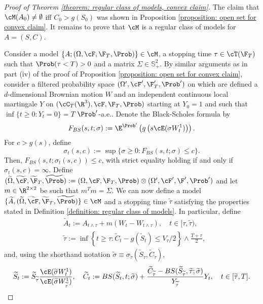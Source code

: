 \documentclass[11pt]{article}
\begin{document}
\begin{proof}[Proof of Theorem \ref{theorem: regular class of models, convex claim}]

The claim that $\cM(A_0) \neq \emptyset$ iff $C_0 > g(S_0)$ was shown in Proposition \ref{proposition: open set for convex claim}. It remains to prove that $\cM$ is a regular class of models for $A = (S,C)$.

Consider a model $\{A ; (\Omega, \cF, \F_T, \Prob) \} \in \cM$, a stopping time $\tau \in \cT(\F_T)$ such that $\Prob( \tau < T) > 0$ and a matrix $\Sigma \in \mathbb{S}^2_+$. By similar arguments as in part (iv) of the proof of Proposition \ref{proposition: open set for convex claim}, consider a filtered probability space $(\Omega^\prime, \cF^\prime, \F^\prime_T, \Prob^\prime)$ on which are defined a $d$-dimensional Brownian motion $W$ and an independent continuous local martingale $Y$ on $(\cC_T(\R^3), \cF, \F_T, \Prob)$ starting at $Y_0 = 1$ and such that $\inf\{t \geq 0 : Y_t = 0\} = T$ $\Prob^\prime$-a.e.. Denote the Black-Scholes formula by
$$
F_{BS}(s,t;\sigma) := \E^{\Prob^\prime} \left( g\left( s \cE(\sigma W^1_t) \right) \right).
$$
For $c > g(s)$, define
$$
\sigma_t(s,c) := \sup\{ \sigma \geq 0 : F_{BS}(s,t; \sigma) \leq c \}.
$$
Then, $F_{BS}(s,t;\sigma_t(s,c)) \leq c$, with strict equality holding if and only if $\sigma_t(s,c) = \infty$. Define $(\widetilde{\Omega}, \widetilde{\cF},\widetilde{\F}_T,\widetilde{\Prob}) := (\Omega, \cF, \F_T, \Prob) \otimes (\Omega^\prime, \cF^\prime, \F^\prime, \Prob^\prime)$ and let $m \in \R^{2 \times 2}$ be such that $m^T m = \Sigma$. We can now define a model $\{ \widetilde{A}, (\widetilde{\Omega},\widetilde{\cF},\widetilde{\F}_T,\widetilde{\Prob}) \} \in \cM$ and a stopping time $\widetilde{\tau}$ satisfying the properties stated in Definition \ref{definition: regular class of models}. In particular, define
\begin{align*}
&\widetilde{A}_t := A_{t \wedge \tau} + m( W_t - W_{t \wedge \tau}), \quad t \in [\tau, \widetilde{\tau}), \\
&\widetilde{\tau} := \inf \left\{ t \geq \tau : \widetilde{C}_t - g(\widetilde{S}_t) \leq V_\tau/2 \right\} \wedge \frac{T + \tau}{2},
\end{align*}
and, using the shorthand notation $\widetilde{\sigma} \equiv \sigma_{\widetilde{\tau}}(\widetilde{S}_{\widetilde{\tau}},\widetilde{C}_{\widetilde{\tau}})$,
$$
\widetilde{S}_t := \widetilde{S}_{\widetilde{\tau}} \frac{\cE( \widetilde{\sigma} W^1_t)}{\cE( \widetilde{\sigma} W^1_{\widetilde{\tau}})}, \quad 
\widetilde{C}_t := BS(\widetilde{S}_t, t; \widetilde{\sigma}) + \frac{\widetilde{C}_{\widetilde{\tau}} - BS(\widetilde{S}_{\widetilde{\tau}}, \widetilde{\tau}; \widetilde{\sigma})}{Y_{\widetilde{\tau}}} Y_t, \quad t \in [\widetilde{\tau},T].
$$
\end{proof}
\end{document}
